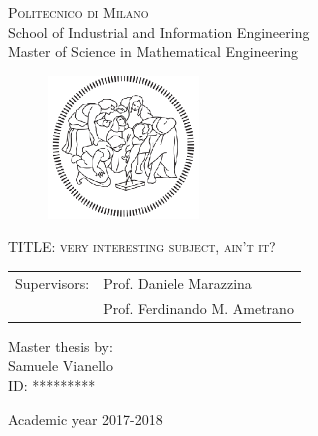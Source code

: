 \begin{titlepage}

	\begin{center}
		\normalsize 
			\textsc{Politecnico di Milano}\\
			School of Industrial and Information Engineering\\
			Master of Science in Mathematical Engineering\\

	\end{center}
	\vspace{.6cm}
	
	\begin{figure}[htpb]
		\centering
		\includegraphics[width=4cm]{Cover/polimi}
	\end{figure}
	\vspace{.6cm}
	
	\begin{center}
		\LARGE
			\textsc{TITLE: very interesting subject, ain't it?}
	\end{center}
	\vspace{1.6cm}

	\begin{flushleft}
		\large
		\begin{tabular}{ll}
		Supervisors:    & Prof. Daniele Marazzina      \\
		             		   & Prof. Ferdinando M. Ametrano
		\end{tabular}
		\vspace{1cm}
	\end{flushleft}
	
	\begin{flushright}
		\large
		Master thesis by:\\
		Samuele Vianello\\
		ID: *********\\		
	\end{flushright}
	
	\vspace*{\fill}
	\begin{center}
		Academic year 2017-2018
	\end{center}
	
\end{titlepage}
